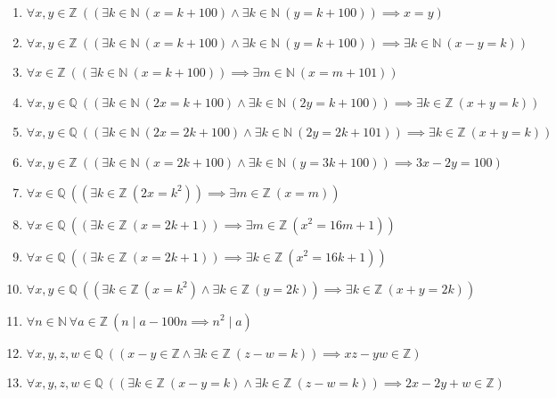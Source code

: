 \documentclass[11pt,a4paper]{article}
\begin{document}
\begin{enumerate}
\item $\displaystyle \forall x, y \in \mathbb{Z}\ ((\exists k \in \mathbb{N}\ (x = k + 100) \land \exists k \in \mathbb{N}\ (y = k + 100)) \implies x = y)$
\item $\displaystyle \forall x, y \in \mathbb{Z}\ ((\exists k \in \mathbb{N}\ (x = k + 100) \land \exists k \in \mathbb{N}\ (y = k + 100)) \implies \exists k \in \mathbb{N}\ (x - y = k))$
\item $\displaystyle \forall x \in \mathbb{Z}\ ((\exists k \in \mathbb{N}\ (x = k + 100)) \implies \exists m \in \mathbb{N}\ (x = m + 101))$
\item $\displaystyle \forall x, y \in \mathbb{Q}\ ((\exists k \in \mathbb{N}\ (2x = k + 100) \land \exists k \in \mathbb{N}\ (2y = k + 100)) \implies \exists k \in \mathbb{Z}\ (x + y = k))$
\item $\displaystyle \forall x, y \in \mathbb{Q}\ ((\exists k \in \mathbb{N}\ (2x = 2k + 100) \land \exists k \in \mathbb{N}\ (2y = 2k + 101)) \implies \exists k \in \mathbb{Z}\ (x + y = k))$
\item $\displaystyle \forall x, y \in \mathbb{Z}\ ((\exists k \in \mathbb{N}\ (x = 2k + 100) \land \exists k \in \mathbb{N}\ (y = 3k + 100)) \implies 3x - 2y = 100)$
\item $\displaystyle \forall x \in \mathbb{Q}\ ((\exists k \in \mathbb{Z}\ (2x = k^{2})) \implies \exists m \in \mathbb{Z}\ (x = m))$
\item $\displaystyle \forall x \in \mathbb{Q}\ ((\exists k \in \mathbb{Z}\ (x = 2k + 1)) \implies \exists m \in \mathbb{Z}\ (x^{2} = 16m + 1))$
\item $\displaystyle \forall x \in \mathbb{Q}\ ((\exists k \in \mathbb{Z}\ (x = 2k + 1)) \implies \exists k \in \mathbb{Z}\ (x^{2} = 16k + 1))$
\item $\displaystyle \forall x, y \in \mathbb{Q}\ ((\exists k \in \mathbb{Z}\ (x = k^{2}) \land \exists k \in \mathbb{Z}\ (y = 2k)) \implies \exists k \in \mathbb{Z}\ (x + y = 2k))$
\item $\displaystyle \forall n \in \mathbb{N}\ \forall a \in \mathbb{Z}\ (n \mid a - 100n \implies n^{2} \mid a)$
\item $\displaystyle \forall x, y, z, w \in \mathbb{Q}\ ((x - y \in \mathbb{Z} \land \exists k \in \mathbb{Z}\ (z - w = k)) \implies xz - yw \in \mathbb{Z})$
\item $\displaystyle \forall x, y, z, w \in \mathbb{Q}\ ((\exists k \in \mathbb{Z}\ (x - y = k) \land \exists k \in \mathbb{Z}\ (z - w = k)) \implies 2x - 2y + w \in \mathbb{Z})$
\end{enumerate}
\end{document}
